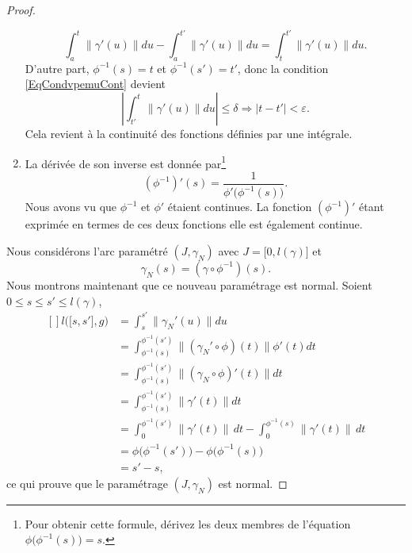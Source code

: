 \begin{proof}
\begin{enumerate}
\begin{equation}
			      \int_a^t\big\| \gamma'(u) \big\|du-\int_a^{t'}\big\| \gamma'(u) \big\|du=\int_{t}^{t'}\big\| \gamma'(u) \big\|du.
		      \end{equation}
		      D'autre part, \( \phi^{-1}(s)=t\) et \( \phi^{-1}(s')=t'\), donc la condition  \eqref{EqCondvpemuCont} devient
		      \begin{equation}
			      |   \int_{t'}^t\big\| \gamma'(u) \big\|du  |\leq\delta\Rightarrow | t-t' |<\varepsilon.
		      \end{equation}
		      Cela revient à la continuité des fonctions définies par une intégrale.
		\item
		      La dérivée de son inverse est donnée par\footnote{Pour obtenir cette formule, dérivez les deux membres de l'équation \( \phi\big( \phi^{-1}(s) \big)=s\).}
		      \begin{equation}
			      (\phi^{-1})'(s)=\frac{1}{\phi'\big( \phi^{-1}(s) \big)}.
		      \end{equation}
		      Nous avons vu que \( \phi^{-1}\) et \( \phi'\) étaient continues. La fonction \( (\phi^{-1})'\) étant exprimée en termes de ces deux fonctions elle est également continue.
	\end{enumerate}

	Nous considérons l'arc paramétré \( (J,\gamma_N)\) avec \( J=\mathopen[ 0 , l(\gamma) \mathclose]\) et
	\begin{equation}
		\gamma_N(s)=(\gamma\circ\phi^{-1})(s).
	\end{equation}
	Nous montrons maintenant que ce nouveau paramétrage est normal. Soient \( 0\leq s\leq s'\leq l(\gamma)\),
	\begin{equation}
		\begin{aligned}[]
			l\big( \mathopen[ s , s' \mathclose],g \big) & =\int_s^{s'}\big\| \gamma_N'(u) \big\|du                                                                 \\
			                                             & =\int_{\phi^{-1}(s)}^{\phi^{-1}(s')}\big\| (\gamma_N'\circ\phi)(t) \big\|\phi'(t)dt                      \\
			                                             & =\int_{\phi^{-1}(s)}^{\phi^{-1}(s')}\big\| (\gamma_N\circ\phi)'(t) \big\|dt                              \\
			                                             & =\int_{\phi^{-1}(s)}^{\phi^{-1}(s')}\big\| \gamma'(t) \big\|dt                                           \\
			                                             & =\int_{0}^{\phi^{-1}(s')}\big\| \gamma'(t) \big\|\,dt -\int_0^{\phi^{-1}(s)}\big\| \gamma'(t) \big\|\,dt \\
			                                             & =\phi\big( \phi^{-1}(s') \big)-\phi\big( \phi^{-1}(s) \big)                                              \\
			                                             & =s'-s,
		\end{aligned}
	\end{equation}
	ce qui prouve que le paramétrage \( (J,\gamma_N)\) est normal.
\end{proof}

